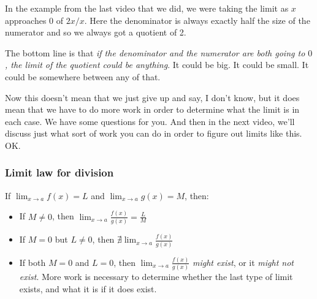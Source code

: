 \documentclass[pdftex, brazil, 12pt, twoside]{article}
\begin{document}
In the example from the last video that we did,
we were taking the limit as $x$ approaches $0$ of $2x/x$.
Here the denominator is always exactly half the size
of the numerator and so we always got a quotient of 2.

\begin{figure}[H]
  \begin{center}
  \end{center}
\end{figure}

The bottom line is that \emph{if the denominator and the numerator
are both going to $0$, the limit of the quotient
could be anything}.
It could be big.
It could be small.
It could be somewhere between any of that.

Now this doesn't mean that we just give up and say,
I don't know, but it does mean that we
have to do more work in order to determine
what the limit is in each case.
We have some questions for you.
And then in the next video, we'll
discuss just what sort of work you can do in order
to figure out limits like this.
OK.

\subsubsection{Limit law for division}
\label{u0-lim-quo-limit-law-div}

If $\displaystyle \lim_{x \to a}f(x) = L$ and $\displaystyle \lim_{x \to a}g(x) = M$,
then:

\begin{itemize}
\item If $M \ne 0$, then $\displaystyle \lim_{x \to a}\frac{f(x)}{g(x)} = \frac{L}{M}$
\item If $M = 0$ but $L \ne 0$, then $\displaystyle \nexists \lim_{x \to a}\frac{f(x)}{g(x)}$
\item If both $M = 0$ and $L = 0$, then $\displaystyle \lim_{x \to a}\frac{f(x)}{g(x)}$
  \emph{might exist}, or it \emph{might not exist}. More work is necessary to determine whether the
  last type of limit exists, and what it is if it does exist.
\end{itemize}
\end{document}
